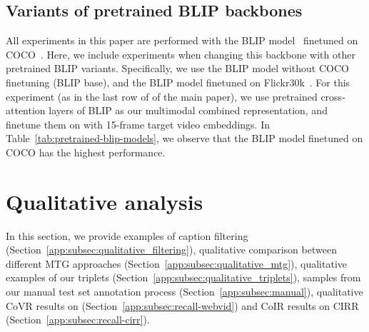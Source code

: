 \subsection{Variants of pretrained BLIP backbones}
\label{app:subsec:pretrained-blip-models}
All experiments in this paper
are performed with the BLIP model~\cite{BLIP} finetuned on COCO~\cite{coco}. Here, we include
experiments when changing this backbone with other pretrained BLIP variants.
Specifically, we use the BLIP model without COCO finetuning (BLIP base),
and the BLIP model finetuned on Flickr30k~\cite{Plummer2015Flickr30k}. For this experiment
(as in the last row of
\if{} \fi
of the main paper),
we use pretrained cross-attention layers of BLIP as our multimodal combined representation,
and finetune them on \ourDS with 15-frame target video embeddings.
In Table~\ref{tab:pretrained-blip-models}, we observe that the BLIP model finetuned on COCO has the highest performance.

\begin{table} \setlength\tabcolsep{5pt}
    \caption{\textbf{Variants of pretrained BLIP backbones:} 
    We compare the BLIP model without finetuning (base), BLIP finetuned on Flickr30k, and BLIP finetuned on COCO (the one used in the rest of the paper)~\cite{BLIP}.
    For this experiment, we finetune the models on \ourDS using the cross-attention layers of
    BLIP as the fusion method, and 15 frames for the target video as in the last row
    of 
    \if{} \fi
    }
    \centering
\label{tab:pretrained-blip-models}
\end{table} 


\section{Qualitative analysis}
\label{app:sec:qualitative-examples}
In this section, we provide
examples of caption filtering (Section~\ref{app:subsec:qualitative_filtering}),
qualitative comparison between different MTG approaches (Section~\ref{app:subsec:qualitative_mtg}),
qualitative examples of our \ourDS triplets (Section~\ref{app:subsec:qualitative_triplets}),
samples from our manual test set annotation process (Section~\ref{app:subsec:manual}),
qualitative CoVR results on \ourDSm (Section~\ref{app:subsec:recall-webvid})
and CoIR results on CIRR (Section~\ref{app:subsec:recall-cirr}).

